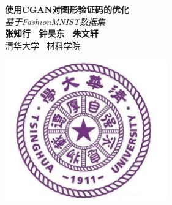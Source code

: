 \documentclass[portrait]{a0poster}
\begin{document}
\begin{CJK}{UTF8}{gbsn}
\begin{minipage}[b]{0.9\linewidth}
\veryHuge \color{NavyBlue} \textbf{使用CGAN对图形验证码的优化} \color{Black}\\ %
\Huge\textit{基于FashionMNIST数据集}\\[2cm] %
\huge \textbf{张知行 \ 钟昊东 \ 朱文轩}\\[0.5cm] %
\huge 清华大学 \ 材料学院\\[0.4cm] %

\end{minipage}
\end{CJK}
%
\begin{minipage}[b]{0.45\linewidth}
\includegraphics[width=7cm]{tsinghua.jpg}\\

\end{minipage}

\vspace{1cm} %
\end{document}
